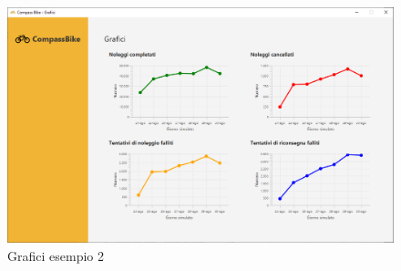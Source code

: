 \documentclass[a4paper, 12pt]{article}
\begin{document}
	\begin{figure}[H]
	\caption{Grafici esempio 2}
	\label{charts2}
	\hfill \includegraphics[width=\textwidth]{resources/images/screenshot/ChartsExample2.png} \hspace*{\fill}
	\end{figure}
\newpage
\end{document}
